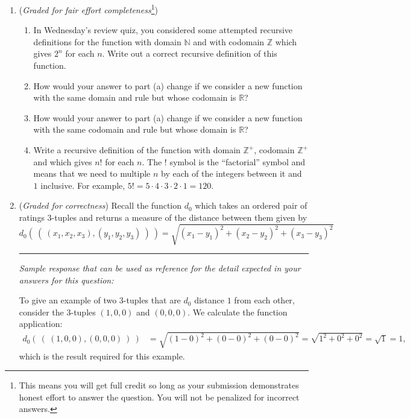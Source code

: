 \begin{enumerate}
\item ({\it Graded for fair effort completeness}\footnote{This means 
you will get full credit so long as your submission demonstrates honest 
effort to answer the question. You will not be penalized for incorrect answers.}) 

\begin{enumerate}
    \item In Wednesday's review quiz, you considered some attempted 
    recursive definitions for the function
    with domain $\mathbb{N}$ and with codomain $\mathbb{Z}$
    which gives $2^n$ for each $n$. 
    Write out a correct recursive definition of this function.
    \item How would your answer to part (a) change if we consider
    a new function with the same domain and rule but whose codomain 
    is $\mathbb{R}$?
    \item How would your answer to part (a) change if we consider
    a new function with the same codomain and rule but whose domain 
    is $\mathbb{R}$?
    \item Write a recursive definition of the function with domain $\mathbb{Z}^+$,
    codomain $\mathbb{Z}^+$ and which gives $n!$ for each $n$. The $!$ symbol
    is the ``factorial'' symbol and means that we need to multiple $n$ by each of the integers
    between it and $1$ inclusive. For example, $5! = 5 \cdot 4 \cdot 3 \cdot 2 \cdot 1 = 120$.
\end{enumerate}

\item ({\it Graded for correctness}) Recall the function
$d_0$ which takes an ordered pair of ratings $3$-tuples and returns a measure
of the distance between them 
given by
\[
d_0 (~(~ (x_1, x_2, x_3), (y_1, y_2, y_3) ~) ~) = \sqrt{ (x_1 - y_1)^2 + (x_2 - y_2)^2 + (x_3 -y_3)^2}
\]

\rule{0.5\textwidth}{.4pt}

{\it Sample response that can be used as reference for the detail expected 
in your answers for this question: } 

To give an example of two $3$-tuples that are $d_0$ distance $1$ from each other, 
consider the $3$-tuples $(1,0,0)$ and $(0,0,0)$. We calculate the function application:
\begin{align*}
    d_0 (~(~ (1, 0,0), (0,0,0) ~) ~) &= \sqrt{ (1 - 0)^2 + (0 - 0)^2 + (0 -0)^2} = \sqrt{1^2 + 0^2 + 0^2} = \sqrt{1} = 1,
\end{align*}
which is the result required for this example.


\end{enumerate}
